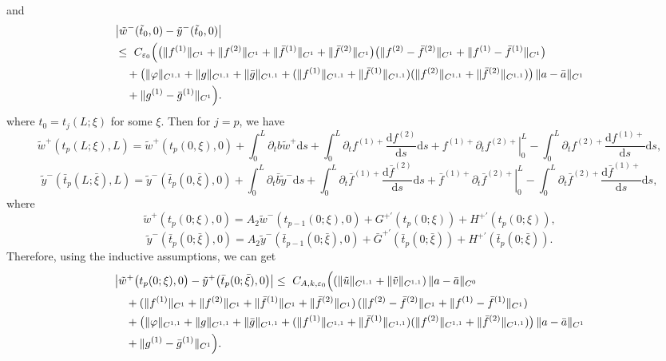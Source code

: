 \documentclass[a4paper,reqno,11pt]{amsart}
\numberwithin{equation}{section} %
\begin{document}
and
\[
\begin{aligned}
&\bigl|\tilde w^-(\tilde t_0,0)-\tilde y ^-(\tilde t_0,0)\bigr|\\
&\le{}\ C_{\varepsilon_0}\Bigl(
  \bigl(\|f^{(1)}\|_{C^{1}}+\|f^{(2)}\|_{C^{1}}
       +\|\bar f^{(1)}\|_{C^{1}}+\|\bar f^{(2)}\|_{C^{1}}\bigr)
  \bigl(\|f^{(2)}-\bar f^{(2)}\|_{C^{1}}
       +\|f^{(1)}-\bar f^{(1)}\|_{C^{1}}\bigr)
\\
&\quad 
  + \bigl(\|\varphi\|_{C^{1,1}}+\|g\|_{C^{1,1}}+\|\bar g\|_{C^{1,1}}
     + (\|f^{(1)}\|_{C^{1,1}}+\|\bar f^{(1)}\|_{C^{1,1}})
       (\|f^{(2)}\|_{C^{1,1}}+\|\bar f^{(2)}\|_{C^{1,1}})\bigr)
       \,\|a-\bar a\|_{C^{1}}
\\
&\quad
  + \|g^{(1)}-\bar g^{(1)}\|_{C^{1}}
\Bigr). 
\end{aligned}
\]
where $t_0=t_j(L;\xi)$ for some $\xi$. Then for $j=p$, we have
$$
\tilde{w}^+\left( t_p(L;\xi ),L \right) =\tilde{w}^+(t_p(0,\xi ),0)+\int_0^L{\partial _tb\tilde{w}^+\mathrm{d}s}+\int_0^L{\partial _tf^{(1)+}\frac{\mathrm{d}f^{(2)}}{\mathrm{d}s}\mathrm{d}s}+\left. f^{(1)+}\partial _tf^{(2)+} \right|_{0}^{L}-\int_0^L{\partial _t{f}^{(2)+}\frac{\mathrm{d}{f}^{(1)+}}{\mathrm{d}s}\mathrm{d}s},
$$
$$
\tilde{y}^-\left( \bar{t}_p(L;\bar{\xi}),L \right) =\tilde{y}^-(\bar{t}_p(0,\bar{\xi}),0)+\int_0^L{\partial _t\bar{b}\tilde{y}^-\mathrm{d}s}+\int_0^L{\partial _t\bar{f}^{(1)+}\frac{\mathrm{d}\bar{f}^{(2)}}{\mathrm{d}s}\mathrm{d}s}+\left. \bar{f}^{(1)+}\partial _t\bar{f}^{(2)+} \right|_{0}^{L}-\int_0^L{\partial _t{\bar{f}}^{(2)+}\frac{\mathrm{d}{\bar{f}}^{(1)+}}{\mathrm{d}s}\mathrm{d}s},
$$
where
$$
\tilde{w}^+\left( t_p\left( 0;\xi \right) ,0 \right) =A_2\tilde{w}^-\left( t_{p-1}\left( 0;\xi \right) ,0 \right) +G^{+ \prime}\left( t_p(0;\xi ) \right) +H^{+\prime}\left( t_p(0;\xi ) \right), 
$$
$$
\tilde{y}^-\left( \bar{t}_p\left( 0;\bar{\xi} \right) ,0 \right) =A_2\tilde{y}^-\left( \bar{t}_{p-1}\left( 0;\bar{\xi} \right) ,0 \right) +\bar{G}^{+\prime}\left( \bar{t}_p(0;\bar{\xi}) \right) +H^{+ \prime}\left( \bar{t}_p(0;\bar{\xi}) \right) .
$$
Therefore, using the inductive assumptions, we can get
\[
\begin{aligned}
&\bigl|\tilde w^+\bigl(t_p(0;\xi),0\bigr)-\tilde y ^+\bigl(\bar t_p(0;\bar\xi),0\bigr)\bigr|
\le{}\ C_{A,k,\varepsilon_0}\Bigl(
  (\|\tilde u\|_{C^{1,1}}+\|\tilde v\|_{C^{1,1}})\,\|a-\bar a\|_{C^{0}} \\
&\quad
  + (\|f^{(1)}\|_{C^{1}}+\|f^{(2)}\|_{C^{1}}
     +\|\bar f^{(1)}\|_{C^{1}}+\|\bar f^{(2)}\|_{C^{1}})\,
    (\|f^{(2)}-\bar f^{(2)}\|_{C^{1}}+\|f^{(1)}-\bar f^{(1)}\|_{C^{1}}) \\
&\quad
  + \bigl(\|\varphi\|_{C^{1,1}}+\|g\|_{C^{1,1}}+\|\bar g\|_{C^{1,1}}
     + (\|f^{(1)}\|_{C^{1,1}}+\|\bar f^{(1)}\|_{C^{1,1}})
       (\|f^{(2)}\|_{C^{1,1}}+\|\bar f^{(2)}\|_{C^{1,1}})\bigr)\,
    \|a-\bar a\|_{C^{1}} \\
&\quad
  + \|g^{(1)}-\bar g^{(1)}\|_{C^{1}}
\Bigr).
\end{aligned}
\]
\end{document}
